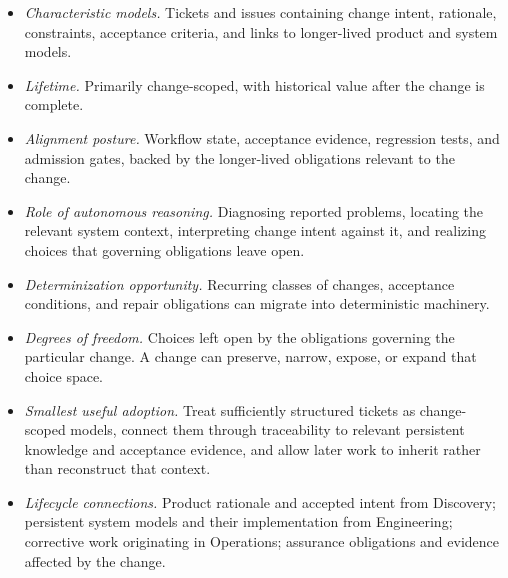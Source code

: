 \begin{itemize}
\tightlist
\item
  \emph{Characteristic models.} Tickets and issues containing change intent, rationale, constraints, acceptance criteria, and links to longer-lived product and system models.
\item
  \emph{Lifetime.} Primarily change-scoped, with historical value after the change is complete.
\item
  \emph{Alignment posture.} Workflow state, acceptance evidence, regression tests, and admission gates, backed by the longer-lived obligations relevant to the change.
\item
  \emph{Role of autonomous reasoning.} Diagnosing reported problems, locating the relevant system context, interpreting change intent against it, and realizing choices that governing obligations leave open.
\item
  \emph{Determinization opportunity.} Recurring classes of changes, acceptance conditions, and repair obligations can migrate into deterministic machinery.
\item
  \emph{Degrees of freedom.} Choices left open by the obligations governing the particular change. A change can preserve, narrow, expose, or expand that choice space.
\item
  \emph{Smallest useful adoption.} Treat sufficiently structured tickets as change-scoped models, connect them through traceability to relevant persistent knowledge and acceptance evidence, and allow later work to inherit rather than reconstruct that context.
\item
  \emph{Lifecycle connections.} Product rationale and accepted intent from Discovery; persistent system models and their implementation from Engineering; corrective work originating in Operations; assurance obligations and evidence affected by the change.
\end{itemize}
